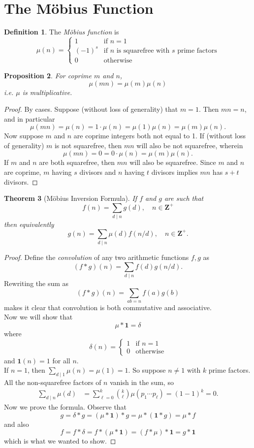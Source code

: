 \documentclass{amsbook}
\numberwithin{section}{chapter}
\theoremstyle{plain}
\newtheorem{thm}{Theorem}[section]
\newtheorem{prop}[thm]{Proposition}
\theoremstyle{definition}
\newtheorem{defn}[thm]{Definition}
\def\br{~\\[1em]}
\def\ZZ{\mathbf Z}
\begin{document}
\section{The M\"obius Function}
\begin{defn}
The \textit{M\"obius function} is
\[\mu(n) = 
\begin{cases}
1	&\text{if }n=1\\
(-1)^s &\text{if $n$ is squarefree with $s$ prime factors}\\
0 &\text{otherwise}
\end{cases}
\]
\end{defn}
\begin{prop}
For coprime $m$ and $n$,
\[\mu(mn) = \mu(m)\mu(n)\]
i.e. $\mu$ is multiplicative.
\end{prop}
\begin{proof}
By cases. Suppose (without loss of generality)
that $m = 1$. Then $mn = n$, and in particular
\[\mu(mn) = \mu(n) = 1\cdot\mu(n) = \mu(1)\mu(n) = \mu(m)\mu(n).\]
Now suppose $m$ and $n$ are coprime integers both not equal to 1.
If (without loss of generality) $m$ is not squarefree, then
$mn$ will also be not squarefree, wherein
\[\mu(mn) = 0 = 0\cdot\mu(n) = \mu(m)\mu(n).\]
If $m$ and $n$ are both squarefree, then $mn$ will also be 
squarefree. Since $m$ and $n$ are coprime,
$m$ having $s$ divisors and $n$ having $t$ divisors implies $mn$
has $s + t$ divisors.
\end{proof}
\begin{thm}[M\"obius Inversion Formula]
If $f$ and $g$ are such that
\[f(n) = \sum_{d\mid n}g(d),\quad n\in\ZZ^+\]
then equivalently
\[g(n) = \sum_{d\mid n}\mu(d)f(n/d),\quad n\in\ZZ^+.\]
\end{thm}
\begin{proof}
Define the \textit{convolution} of any two arithmetic functions
$f, g$ as
\[(f * g)(n) = \sum_{d\mid n}f(d)g(n/d).\]
Rewriting the sum as
\[(f * g)(n) = \sum_{ab = n}f(a)g(b)\]
makes it clear that convolution is both commutative and associative.
\br
Now we will show that
\[\mu * \boldsymbol 1 = \delta\]
where 
\[\delta(n) = \begin{cases}
1 &\text{if }n=1\\
0 &\text{otherwise}
\end{cases}\]
and $\boldsymbol 1(n) = 1$
for all $n$.
\br
If $n = 1$, then $\sum_{d\mid 1}\mu(n) = \mu(1) = 1$.
So suppose $n\ne 1$ with $k$ prime factors.
All the non-squarefree factors of $n$
vanish in the sum, so
\begin{align*}
\sum_{d\mid n}\mu(d) &= \sum_{\ell= 0}^k{k\choose\ell}
\mu\left(p_1\cdots p_\ell\right)
= (1 - 1)^k = 0.
\end{align*}
Now we prove the formula. Observe that
\[g = \delta * g = (\mu*\boldsymbol 1)*g 
= \mu*(\boldsymbol 1 * g) = \mu * f\]
and
also 
\[f = f *\delta = f*(\mu *\boldsymbol 1) = (f*\mu)*\boldsymbol 1
= g*\boldsymbol 1\]
which is what we wanted to show.
\end{proof}
\end{document}
